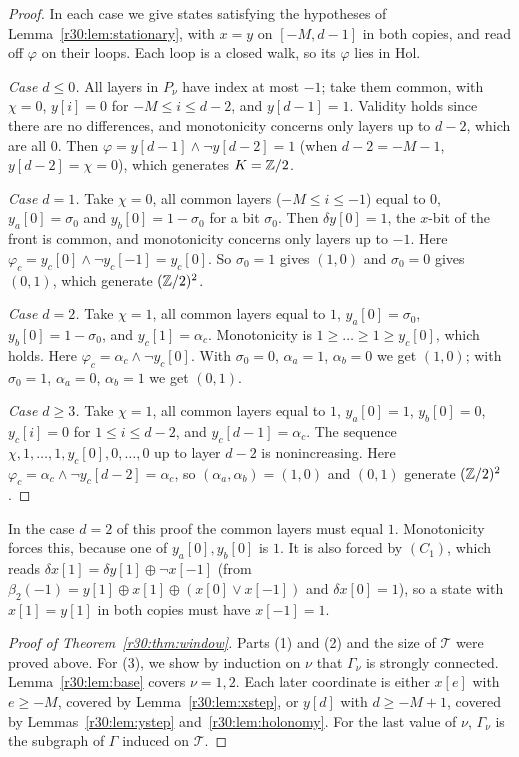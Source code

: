 \begin{proof}
In each case we give states satisfying the hypotheses of Lemma~\ref{r30:lem:stationary}, with $x=y$ on $[-M,d-1]$ in both copies, and read off $\varphi$ on their loops. Each loop is a closed walk, so its $\varphi$ lies in $\mathrm{Hol}$.

\emph{Case $d\le0$.} All layers in $P_\nu$ have index at most $-1$; take them common, with $\chi=0$, $y[i]=0$ for $-M\le i\le d-2$, and $y[d-1]=1$. Validity holds since there are no differences, and monotonicity concerns only layers up to $d-2$, which are all $0$. Then $\varphi=y[d-1]\wedge\neg y[d-2]=1$ (when $d-2=-M-1$, $y[d-2]=\chi=0$), which generates $K=\mathbb{Z}/2$.

\emph{Case $d=1$.} Take $\chi=0$, all common layers ($-M\le i\le-1$) equal to $0$, $y_a[0]=\sigma_0$ and $y_b[0]=1-\sigma_0$ for a bit $\sigma_0$. Then $\delta y[0]=1$, the $x$-bit of the front is common, and monotonicity concerns only layers up to $-1$. Here $\varphi_c=y_c[0]\wedge\neg y_c[-1]=y_c[0]$. So $\sigma_0=1$ gives $(1,0)$ and $\sigma_0=0$ gives $(0,1)$, which generate $(\mathbb{Z}/2)^2$.

\emph{Case $d=2$.} Take $\chi=1$, all common layers equal to $1$, $y_a[0]=\sigma_0$, $y_b[0]=1-\sigma_0$, and $y_c[1]=\alpha_c$. Monotonicity is $1\ge\dots\ge1\ge y_c[0]$, which holds. Here $\varphi_c=\alpha_c\wedge\neg y_c[0]$. With $\sigma_0=0$, $\alpha_a=1$, $\alpha_b=0$ we get $(1,0)$; with $\sigma_0=1$, $\alpha_a=0$, $\alpha_b=1$ we get $(0,1)$.

\emph{Case $d\ge3$.} Take $\chi=1$, all common layers equal to $1$, $y_a[0]=1$, $y_b[0]=0$, $y_c[i]=0$ for $1\le i\le d-2$, and $y_c[d-1]=\alpha_c$. The sequence $\chi,1,\dots,1,y_c[0],0,\dots,0$ up to layer $d-2$ is nonincreasing. Here $\varphi_c=\alpha_c\wedge\neg y_c[d-2]=\alpha_c$, so $(\alpha_a,\alpha_b)=(1,0)$ and $(0,1)$ generate $(\mathbb{Z}/2)^2$.
\end{proof}

In the case $d=2$ of this proof the common layers must equal $1$. Monotonicity forces this, because one of $y_a[0],y_b[0]$ is $1$. It is also forced by $(C_1)$, which reads $\delta x[1]=\delta y[1]\oplus\neg x[-1]$ (from $\beta_2(-1)=y[1]\oplus x[1]\oplus(x[0]\vee x[-1])$ and $\delta x[0]=1$), so a state with $x[1]=y[1]$ in both copies must have $x[-1]=1$.

\begin{proof}[Proof of Theorem~\ref{r30:thm:window}]
Parts (1) and (2) and the size of $\mathcal{T}$ were proved above. For (3), we show by induction on $\nu$ that $\Gamma_\nu$ is strongly connected. Lemma~\ref{r30:lem:base} covers $\nu=1,2$. Each later coordinate is either $x[e]$ with $e\ge-M$, covered by Lemma~\ref{r30:lem:xstep}, or $y[d]$ with $d\ge-M+1$, covered by Lemmas~\ref{r30:lem:ystep} and~\ref{r30:lem:holonomy}. For the last value of $\nu$, $\Gamma_\nu$ is the subgraph of $\Gamma$ induced on $\mathcal{T}$.
\end{proof}


